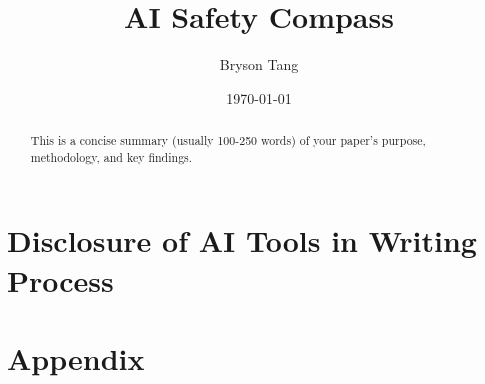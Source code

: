 \documentclass[11pt]{article}
\title{AI Safety Compass}
\author{Bryson Tang}
\date{\today}
\begin{document}
\maketitle

\begin{abstract}
This is a concise summary (usually 100-250 words) of your paper's purpose, methodology, and key findings.
\end{abstract}













\section{Disclosure of AI Tools in Writing Process}


\newpage



\newpage
\appendix
\section*{Appendix}

\end{document}
